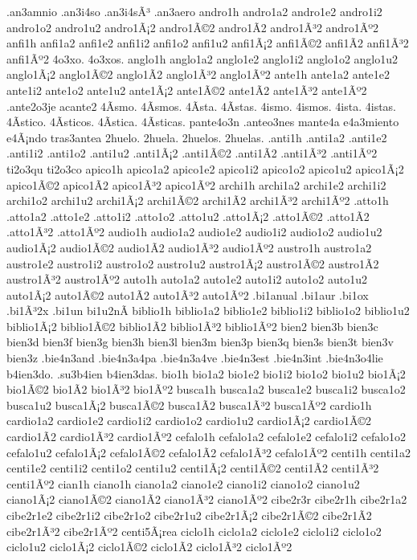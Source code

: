 {.an3amnio
.an3i4so
.an3i4sÃ³
.an3aero
andro1h
andro1a2 andro1e2 andro1i2 andro1o2 andro1u2
andro1Ã¡2 andro1Ã©2 andro1Ã­2 andro1Ã³2 andro1Ãº2
anfi1h
anfi1a2 anfi1e2 anfi1i2 anfi1o2 anfi1u2
anfi1Ã¡2 anfi1Ã©2 anfi1Ã­2 anfi1Ã³2 anfi1Ãº2
4o3xo.
4o3xos.
anglo1h
anglo1a2 anglo1e2 anglo1i2 anglo1o2 anglo1u2
anglo1Ã¡2 anglo1Ã©2 anglo1Ã­2 anglo1Ã³2 anglo1Ãº2
ante1h
ante1a2 ante1e2 ante1i2 ante1o2 ante1u2
ante1Ã¡2 ante1Ã©2 ante1Ã­2 ante1Ã³2 ante1Ãº2
.ante2o3je
acante2
4Ã­smo.
4Ã­smos.
4Ã­sta.
4Ã­stas.
4ismo.
4ismos.
4ista.
4istas.
4Ã­stico.
4Ã­sticos.
4Ã­stica.
4Ã­sticas.
pante4o3n
.anteo3nes
mante4a
e4a3miento
e4Ã¡ndo
tras3antea
2huelo.
2huela.
2huelos.
2huelas.
.anti1h
.anti1a2 .anti1e2 .anti1i2 .anti1o2 .anti1u2
.anti1Ã¡2 .anti1Ã©2 .anti1Ã­2 .anti1Ã³2 .anti1Ãº2
ti2o3qu
ti2o3co
apico1h
apico1a2 apico1e2 apico1i2 apico1o2 apico1u2
apico1Ã¡2 apico1Ã©2 apico1Ã­2 apico1Ã³2 apico1Ãº2
archi1h
archi1a2 archi1e2 archi1i2 archi1o2 archi1u2
archi1Ã¡2 archi1Ã©2 archi1Ã­2 archi1Ã³2 archi1Ãº2
.atto1h
.atto1a2 .atto1e2 .atto1i2 .atto1o2 .atto1u2
.atto1Ã¡2 .atto1Ã©2 .atto1Ã­2 .atto1Ã³2 .atto1Ãº2
audio1h
audio1a2 audio1e2 audio1i2 audio1o2 audio1u2
audio1Ã¡2 audio1Ã©2 audio1Ã­2 audio1Ã³2 audio1Ãº2
austro1h
austro1a2 austro1e2 austro1i2 austro1o2 austro1u2
austro1Ã¡2 austro1Ã©2 austro1Ã­2 austro1Ã³2 austro1Ãº2
auto1h
auto1a2 auto1e2 auto1i2 auto1o2 auto1u2
auto1Ã¡2 auto1Ã©2 auto1Ã­2 auto1Ã³2 auto1Ãº2
.bi1anual
.bi1aur
.bi1ox
.bi1Ã³2x
.bi1un
bi1u2nÃ­
biblio1h
biblio1a2 biblio1e2 biblio1i2 biblio1o2 biblio1u2
biblio1Ã¡2 biblio1Ã©2 biblio1Ã­2 biblio1Ã³2 biblio1Ãº2
bien2
bien3b
bien3c
bien3d
bien3f
bien3g
bien3h
bien3l
bien3m
bien3p
bien3q
bien3s
bien3t
bien3v
bien3z
.bie4n3and
.bie4n3a4pa
.bie4n3a4ve
.bie4n3est
.bie4n3int
.bie4n3o4lie
b4ien3do.
.su3b4ien
b4ien3das.
bio1h
bio1a2 bio1e2 bio1i2 bio1o2 bio1u2
bio1Ã¡2 bio1Ã©2 bio1Ã­2 bio1Ã³2 bio1Ãº2
busca1h
busca1a2 busca1e2 busca1i2 busca1o2 busca1u2
busca1Ã¡2 busca1Ã©2 busca1Ã­2 busca1Ã³2 busca1Ãº2
cardio1h
cardio1a2 cardio1e2 cardio1i2 cardio1o2 cardio1u2
cardio1Ã¡2 cardio1Ã©2 cardio1Ã­2 cardio1Ã³2 cardio1Ãº2
cefalo1h
cefalo1a2 cefalo1e2 cefalo1i2 cefalo1o2 cefalo1u2
cefalo1Ã¡2 cefalo1Ã©2 cefalo1Ã­2 cefalo1Ã³2 cefalo1Ãº2
centi1h
centi1a2 centi1e2 centi1i2 centi1o2 centi1u2
centi1Ã¡2 centi1Ã©2 centi1Ã­2 centi1Ã³2 centi1Ãº2
cian1h
ciano1h
ciano1a2 ciano1e2 ciano1i2 ciano1o2 ciano1u2
ciano1Ã¡2 ciano1Ã©2 ciano1Ã­2 ciano1Ã³2 ciano1Ãº2
cibe2r3r
cibe2r1h
cibe2r1a2 cibe2r1e2 cibe2r1i2 cibe2r1o2 cibe2r1u2
cibe2r1Ã¡2 cibe2r1Ã©2 cibe2r1Ã­2 cibe2r1Ã³2 cibe2r1Ãº2
centi5Ã¡rea
ciclo1h
ciclo1a2 ciclo1e2 ciclo1i2 ciclo1o2 ciclo1u2
ciclo1Ã¡2 ciclo1Ã©2 ciclo1Ã­2 ciclo1Ã³2 ciclo1Ãº2
}
